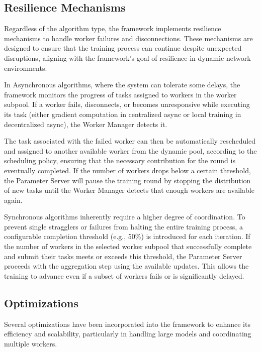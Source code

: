 \subsection{Resilience Mechanisms}
\label{sec:resilience-mechanisms}

Regardless of the algorithm type, the framework implements resilience mechanisms to handle worker failures and disconnections. These mechanisms are designed to ensure that the training process can continue despite unexpected disruptions, aligning with the framework's goal of resilience in dynamic network environments.

In Asynchronous algorithms, where the system can tolerate some delays, the framework monitors the progress of tasks assigned to workers in the worker subpool. If a worker fails, disconnects, or becomes unresponsive while executing its task (either gradient computation in centralized async or local training in decentralized async), the Worker Manager detects it. 

The task associated with the failed worker can then be automatically rescheduled and assigned to another available worker from the dynamic pool, according to the scheduling policy, ensuring that the necessary contribution for the round is eventually completed. If the number of workers drops below a certain threshold, the Parameter Server will pause the training round by stopping the distribution of new tasks until the Worker Manager detects that enough workers are available again.   

Synchronous algorithms inherently require a higher degree of coordination. To prevent single stragglers or failures from halting the entire training process, a configurable completion threshold (e.g., 50\%) is introduced for each iteration. If the number of workers in the selected worker subpool that successfully complete and submit their tasks meets or exceeds this threshold, the Parameter Server proceeds with the aggregation step using the available updates. This allows the training to advance even if a subset of workers fails or is significantly delayed.

\subsection{Optimizations}
\label{sec:optimizations}

Several optimizations have been incorporated into the framework to enhance its efficiency and scalability, particularly in handling large models and coordinating multiple workers.

